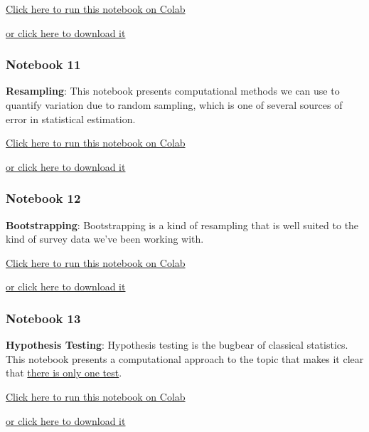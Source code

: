 \href{https://colab.research.google.com/github/AllenDowney/ElementsOfDataScience/blob/v1/10_regression.ipynb}{Click
here to run this notebook on Colab}

\href{https://github.com/AllenDowney/ElementsOfDataScience/raw/v1/10_regression.ipynb}{or
click here to download it}

\hypertarget{notebook-11}{%
\subsubsection{Notebook 11}\label{notebook-11}}

\textbf{Resampling}: This notebook presents computational methods we can
use to quantify variation due to random sampling, which is one of
several sources of error in statistical estimation.

\href{https://colab.research.google.com/github/AllenDowney/ElementsOfDataScience/blob/v1/11_resampling.ipynb}{Click
here to run this notebook on Colab}

\href{https://github.com/AllenDowney/ElementsOfDataScience/raw/v1/11_resampling.ipynb}{or
click here to download it}

\hypertarget{notebook-12}{%
\subsubsection{Notebook 12}\label{notebook-12}}

\textbf{Bootstrapping}: Bootstrapping is a kind of resampling that is
well suited to the kind of survey data we've been working with.

\href{https://colab.research.google.com/github/AllenDowney/ElementsOfDataScience/blob/v1/12_bootstrap.ipynb}{Click
here to run this notebook on Colab}

\href{https://github.com/AllenDowney/ElementsOfDataScience/raw/v1/12_bootstrap.ipynb}{or
click here to download it}

\hypertarget{notebook-13}{%
\subsubsection{Notebook 13}\label{notebook-13}}

\textbf{Hypothesis Testing}: Hypothesis testing is the bugbear of
classical statistics. This notebook presents a computational approach to
the topic that makes it clear that
\href{http://allendowney.blogspot.com/2016/06/there-is-still-only-one-test.html}{there
is only one test}.

\href{https://colab.research.google.com/github/AllenDowney/ElementsOfDataScience/blob/v1/13_hypothesis.ipynb}{Click
here to run this notebook on Colab}

\href{https://github.com/AllenDowney/ElementsOfDataScience/raw/v1/13_hypothesis.ipynb}{or
click here to download it}
